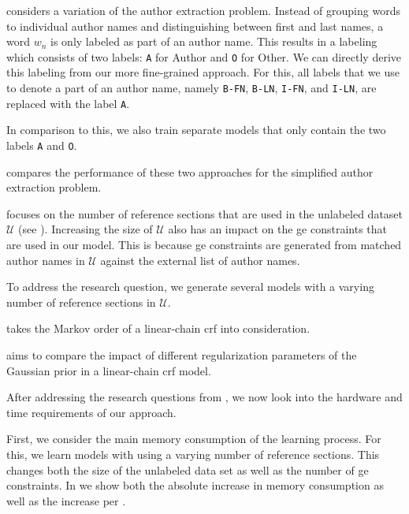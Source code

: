 \bigskip

 considers a variation of the author extraction problem.
Instead of grouping words to individual author names and distinguishing between first and last names, a word $w_n$ is only labeled as part of an author name.
This results in a labeling which consists of two labels:
\texttt{A} for Author and \texttt{O} for Other.
We can directly derive this labeling from our more fine-grained approach.
For this, all labels that we use to denote a part of an author name, namely \texttt{B-FN}, \texttt{B-LN}, \texttt{I-FN}, and \texttt{I-LN}, are replaced with the label \texttt{A}.

In comparison to this, we also train separate models that only contain the two labels \texttt{A} and \texttt{O}.

 compares the performance of these two approaches for the simplified author extraction problem.

\bigskip

 focuses on the number of reference sections that are used in the unlabeled dataset $\mathcal{U}$ (see ).
Increasing the size of $\mathcal{U}$ also has an impact on the \gls{ge} constraints that are used in our model.
This is because \gls{ge} constraints are generated from matched author names in $\mathcal{U}$ against the external list of author names.

To address the research question, we generate several models with a varying number of reference sections in $\mathcal{U}$.

 takes the Markov order of a \gls{linear-chain crf} into consideration.

\bigskip


 aims to compare the impact of different regularization parameters of the Gaussian prior in a \gls{linear-chain crf} model.

\bigskip

After addressing the research questions from , we now look into the hardware and time requirements of our approach.

First, we consider the main memory consumption of the learning process.
For this, we learn models with using a varying number of reference sections.
This changes both the size of the unlabeled data set as well as the number of \gls{ge} constraints.
In  we show both the absolute increase in memory consumption as well as the increase per .







